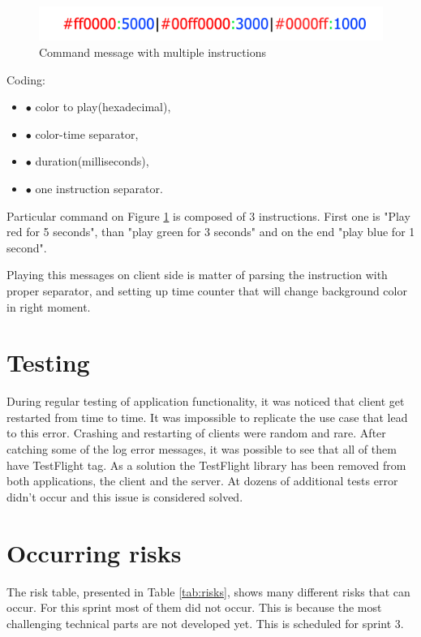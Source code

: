 \begin{figure}[H]
      	\centering
      		\includegraphics[width=16cm]{sprint2/protocol.png}
      	\caption{Command message with multiple instructions}
      	\label{fig:Command_new}
\end{figure}
Coding:
\begin{itemize}
\item[] \textcolor{red!80}{$\bullet$} color to play(hexadecimal),
\item[] \textcolor{green!100}{$\bullet$} color-time separator,
\item[] \textcolor{blue!100}{$\bullet$} duration(milliseconds),
\item[] \textcolor{black!100}{$\bullet$} one instruction separator.
\end{itemize}


Particular command on Figure \ref{fig:Command_new} is composed of 3 instructions. First one is "Play red for 5 seconds", than "play green for 3 seconds" and on the end "play blue for 1 second".

Playing this messages on client side is matter of parsing the instruction with proper separator, and setting up time counter that will change background color in right moment.

\section{Testing}
\label{section:test_flight_bug}
During regular testing of application functionality, it was noticed that client get restarted from time to time. It was impossible to replicate the use case that lead to this error. Crashing and restarting of clients were random and rare. After catching some of the log error messages, it was possible to see that all of them have TestFlight tag. As a solution the TestFlight library has been removed from both applications, the client and the server. At dozens of additional tests error didn't occur and this issue is considered solved.  

\section{Occurring risks}

The risk table, presented in Table \ref{tab:risks}, shows many different risks that can occur. 
For this sprint most of them did not occur. 
This is because the most challenging technical parts are not developed yet. 
This is scheduled for sprint 3. 

